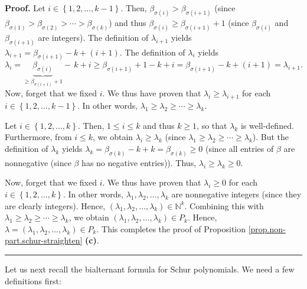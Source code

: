 \documentclass[numbers=enddot,12pt,final,onecolumn,notitlepage]{scrartcl}%
\theoremstyle{definition}
\newenvironment{proof}[1][Proof]{\noindent\textbf{#1.} }{\ \rule{0.5em}{0.5em}}
\begin{document}
\begin{proof}
Let $i\in\left\{  1,2,\ldots,k-1\right\}  $. Then, $\beta_{\sigma\left(
i\right)  }>\beta_{\sigma\left(  i+1\right)  }$ (since $\beta_{\sigma\left(
1\right)  }>\beta_{\sigma\left(  2\right)  }>\cdots>\beta_{\sigma\left(
k\right)  }$) and thus $\beta_{\sigma\left(  i\right)  }\geq\beta
_{\sigma\left(  i+1\right)  }+1$ (since $\beta_{\sigma\left(  i\right)  }$ and
$\beta_{\sigma\left(  i+1\right)  }$ are integers). The definition of
$\lambda_{i+1}$ yields $\lambda_{i+1}=\beta_{\sigma\left(  i+1\right)
}-k+\left(  i+1\right)  $. The definition of $\lambda_{i}$ yields%
\[
\lambda_{i}=\underbrace{\beta_{\sigma\left(  i\right)  }}_{\geq\beta
_{\sigma\left(  i+1\right)  }+1}-\,k+i\geq\beta_{\sigma\left(  i+1\right)
}+1-k+i=\beta_{\sigma\left(  i+1\right)  }-k+\left(  i+1\right)
=\lambda_{i+1}.
\]
Now, forget that we fixed $i$. We thus have proven that $\lambda_{i}%
\geq\lambda_{i+1}$ for each $i\in\left\{  1,2,\ldots,k-1\right\}  $. In other
words, $\lambda_{1}\geq\lambda_{2}\geq\cdots\geq\lambda_{k}$.

Let $i\in\left\{  1,2,\ldots,k\right\}  $. Then, $1\leq i\leq k$ and thus
$k\geq1$, so that $\lambda_{k}$ is well-defined. Furthermore, from $i\leq k$,
we obtain $\lambda_{i}\geq\lambda_{k}$ (since $\lambda_{1}\geq\lambda_{2}%
\geq\cdots\geq\lambda_{k}$). But the definition of $\lambda_{k}$ yields
$\lambda_{k}=\beta_{\sigma\left(  k\right)  }-k+k=\beta_{\sigma\left(
k\right)  }\geq0$ (since all entries of $\beta$ are nonnegative (since $\beta$
has no negative entries)). Thus, $\lambda_{i}\geq\lambda_{k}\geq0$.

Now, forget that we fixed $i$. We thus have proven that $\lambda_{i}\geq0$ for
each $i\in\left\{  1,2,\ldots,k\right\}  $. In other words, $\lambda
_{1},\lambda_{2},\ldots,\lambda_{k}$ are nonnegative integers (since they are
clearly integers). Hence, $\left(  \lambda_{1},\lambda_{2},\ldots,\lambda
_{k}\right)  \in\mathbb{N}^{k}$. Combining this with $\lambda_{1}\geq
\lambda_{2}\geq\cdots\geq\lambda_{k}$, we obtain $\left(  \lambda_{1}%
,\lambda_{2},\ldots,\lambda_{k}\right)  \in P_{k}$. Hence, $\lambda=\left(
\lambda_{1},\lambda_{2},\ldots,\lambda_{k}\right)  \in P_{k}$. This completes
the proof of Proposition \ref{prop.non-part.schur-straighten} \textbf{(c)}.
\end{proof}

Let us next recall the bialternant formula for Schur polynomials. We need a
few definitions first:
\end{document}
